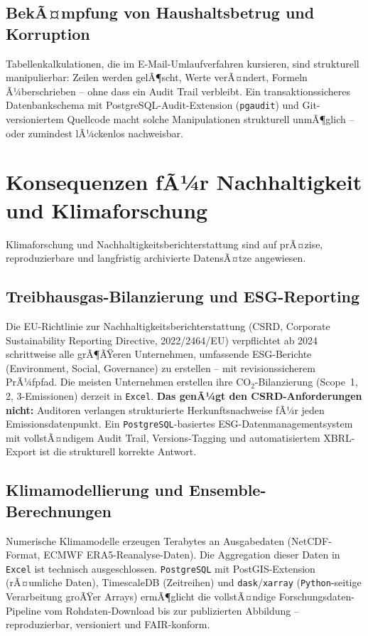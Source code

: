 ﻿\documentclass[12pt,a4paper]{report}
\theoremstyle{definition}
\theoremstyle{remark}
\newcommand{\excel}{\texttt{Excel}}
\newcommand{\pg}{\texttt{PostgreSQL}}
\newcommand{\py}{\texttt{Python}}
\newcommand{\code}[1]{\texttt{#1}}
\begin{document}
\subsection{BekÃ¤mpfung von Haushaltsbetrug und Korruption}

Tabellenkalkulationen, die im E-Mail-Umlaufverfahren kursieren, sind
strukturell manipulierbar: Zeilen werden gelÃ¶scht, Werte verÃ¤ndert,
Formeln Ã¼berschrieben -- ohne dass ein Audit Trail verbleibt.
Ein transaktionssicheres Datenbankschema mit PostgreSQL-Audit-Extension
(\code{pgaudit}) und Git-versioniertem Quellcode macht solche
Manipulationen strukturell unmÃ¶glich -- oder zumindest lÃ¼ckenlos
nachweisbar.

\section{Konsequenzen fÃ¼r Nachhaltigkeit und Klimaforschung}

Klimaforschung und Nachhaltigkeitsberichterstattung sind auf prÃ¤zise,
reproduzierbare und langfristig archivierte DatensÃ¤tze angewiesen.

\subsection{Treibhausgas-Bilanzierung und ESG-Reporting}

Die EU-Richtlinie zur Nachhaltigkeitsberichterstattung (CSRD,
Corporate Sustainability Reporting Directive, 2022/2464/EU)
verpflichtet ab 2024 schrittweise alle grÃ¶ÃŸeren Unternehmen,
umfassende ESG-Berichte (Environment, Social, Governance) zu erstellen
-- mit revisionssicherem PrÃ¼fpfad.
Die meisten Unternehmen erstellen ihre CO$_2$-Bilanzierung
(Scope~1, 2, 3-Emissionen) derzeit in \excel{}.
\textbf{Das genÃ¼gt den CSRD-Anforderungen nicht:}
Auditoren verlangen strukturierte Herkunftsnachweise fÃ¼r jeden
Emissionsdatenpunkt.
Ein \pg-basiertes ESG-Datenmanagementsystem mit vollstÃ¤ndigem Audit
Trail, Versions-Tagging und automatisiertem XBRL-Export ist die
strukturell korrekte Antwort.

\subsection{Klimamodellierung und Ensemble-Berechnungen}

Numerische Klimamodelle erzeugen Terabytes an Ausgabedaten
(NetCDF-Format, ECMWF ERA5-Reanalyse-Daten).
Die Aggregation dieser Daten in \excel{} ist technisch ausgeschlossen.
\pg{} mit PostGIS-Extension (rÃ¤umliche Daten), TimescaleDB
(Zeitreihen) und \code{dask}/\code{xarray} (\py-seitige Verarbeitung
groÃŸer Arrays) ermÃ¶glicht die vollstÃ¤ndige Forschungsdaten-Pipeline
vom Rohdaten-Download bis zur publizierten Abbildung --
reproduzierbar, versioniert und FAIR-konform.
\end{document}
